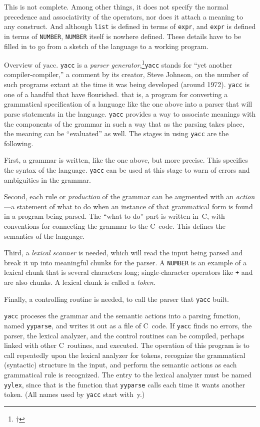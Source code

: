 This is not complete. Among other things, it does not specify
the normal precedence and associativity of the operators, nor
does it attach a meaning to any construct. And although {\tt list}
is defined in terms of {\tt expr}, and {\tt expr} is defined in
terms of {\tt NUMBER}, {\tt NUMBER} itself is nowhere defined.
These details have to be filled in to go from a sketch of the
language to a working program.

\subsect Overview of yacc.
{\tt yacc} is a {\it parser generator},\footnote{$\dag$}{{\tt yacc}
stands for ``yet another compiler-compiler,'' a comment by its
creator, Steve Johnson, on the number of such programs extant
at the time it was being developed (around 1972). {\tt yacc}
is one of a handful that have flourished.} that is, a program
for converting a grammatical specification of a language like
the one above into a parser that will parse statements in the
language. {\tt yacc} provides a way to associate meanings with
the components of the grammar in such a way that as the parsing
takes place, the meaning can be ``evaluated'' as well. The stages
in using {\tt yacc} are the following.

First, a grammar is written, like the one above, but more precise.
This specifies the syntax of the language. {\tt yacc} can be used
at this stage to warn of errors and ambiguities in the grammar.

Second, each rule or {\it production\/} of the grammar can be
augmented with an {\it action}---a statement of what to do
when an instance of that grammatical form is found in a program
being parsed. The ``what to do'' part is written in~C, with
conventions for connecting the grammar to the C~code.
This defines the semantics of the language.

Third, a {\it lexical scanner\/} is needed, which will read
the input being parsed and break it up into meaningful chunks
for the parser. A {\tt NUMBER} is an example of a lexical
chunk that is several characters long; single-character operators
like {\tt+} and {\tt*} are also chunks. A lexical chunk is called
a {\it token}.

Finally, a controlling routine is needed, to call the parser
that {\tt yacc} built.

{\tt yacc} proceses the grammar and the semantic actions into
a parsing function, named {\tt yyparse}, and writes it out as
a file of C~code. If {\tt yacc} finds no errors, the parser,
the lexical analyzer, and the control routines can be compiled,
perhaps linked with other C~routines, and executed. The operation
of this program is to call repeatedly upon the lexical analyzer
for tokens, recognize the grammatical (syntactic) structure in the
input, and perform the semantic actions as each grammatical rule
is recognized. The entry to the lexical analyzer must be named
{\tt yylex}, since that is the function that {\tt yyparse} calls
each time it wants another token. (All names used by {\tt yacc}
start with~y.)

